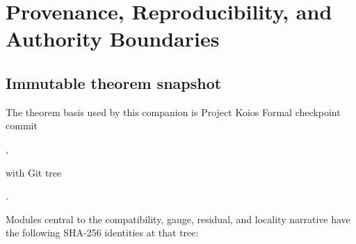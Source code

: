 \chapter{Provenance, Reproducibility, and Authority Boundaries}
\label{app:provenance}

\section{Immutable theorem snapshot}

The theorem basis used by this companion is Project Koios Formal checkpoint commit

\begin{center}
,
\end{center}

with Git tree

\begin{center}
.
\end{center}

Modules central to the compatibility, gauge, residual, and locality narrative have the
following SHA-256 identities at that tree:

